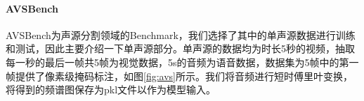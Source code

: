 \documentclass[12pt]{article}
\begin{document}
\paragraph{AVSBench} AVSBench为声源分割领域的Benchmark，我们选择了其中的单声源数据进行训练和测试，因此主要介绍一下单声源部分。单声源的数据均为时长5秒的视频，抽取每一秒的最后一帧共5帧为视觉数据，5s的音频为语音数据，数据集为5帧中的第一帧提供了像素级掩码标注，如图\ref{fig:avs}所示。我们将音频进行短时傅里叶变换，将得到的频谱图保存为pkl文件以作为模型输入。
\begin{figure}[!h]
  \centering
\end{figure}
\end{document}
